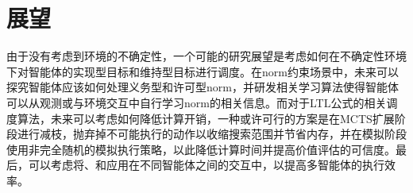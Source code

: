 \section{展望}
由于\SAM 没有考虑到环境的不确定性，一个可能的研究展望是考虑如何在不确定性环境下对智能体的实现型目标和维持型目标进行调度。在norm约束场景中，未来可以探究智能体应该如何处理义务型和许可型norm，并研发相关学习算法使得智能体可以从观测或与环境交互中自行学习norm的相关信息。而对于LTL公式的相关调度算法，未来可以考虑如何降低计算开销，一种或许可行的方案是在MCTS扩展阶段进行减枝，抛弃掉不可能执行的动作以收缩搜索范围并节省内存，并在模拟阶段使用非完全随机的模拟执行策略，以此降低计算时间并提高价值评估的可信度。最后，可以考虑将\SAM 、\SAN 和\SAT 应用在不同智能体之间的交互中，以提高多智能体的执行效率。
